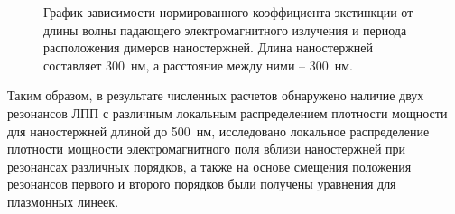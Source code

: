 \begin{figure}
\caption{График зависимости нормированного коэффициента экстинкции от длины волны падающего электромагнитного излучения и периода расположения димеров наностержней. Длина наностержней составляет 300~нм, а расстояние между ними -- 300~нм.}
\label{img:BCperiod}
\end{figure}

Таким образом, в результате численных расчетов  обнаружено наличие двух резонансов ЛПП  с различным локальным распределением плотности мощности для наностержней длиной до 500~нм, исследовано локальное распределение плотности мощности электромагнитного поля вблизи наностержней при резонансах различных порядков, а также на основе смещения положения резонансов первого и второго порядков были получены уравнения для плазмонных линеек.

